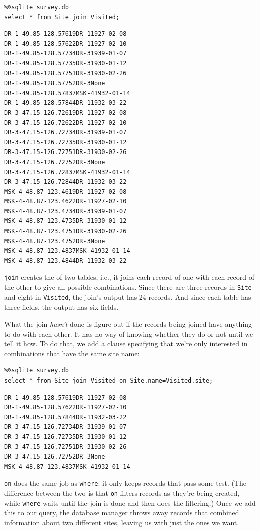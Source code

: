 \documentclass{book}
\begin{document}
\begin{verbatim}
%%sqlite survey.db
select * from Site join Visited;
\end{verbatim}

\begin{verbatim}
DR-1-49.85-128.57619DR-11927-02-08
DR-1-49.85-128.57622DR-11927-02-10
DR-1-49.85-128.57734DR-31939-01-07
DR-1-49.85-128.57735DR-31930-01-12
DR-1-49.85-128.57751DR-31930-02-26
DR-1-49.85-128.57752DR-3None
DR-1-49.85-128.57837MSK-41932-01-14
DR-1-49.85-128.57844DR-11932-03-22
DR-3-47.15-126.72619DR-11927-02-08
DR-3-47.15-126.72622DR-11927-02-10
DR-3-47.15-126.72734DR-31939-01-07
DR-3-47.15-126.72735DR-31930-01-12
DR-3-47.15-126.72751DR-31930-02-26
DR-3-47.15-126.72752DR-3None
DR-3-47.15-126.72837MSK-41932-01-14
DR-3-47.15-126.72844DR-11932-03-22
MSK-4-48.87-123.4619DR-11927-02-08
MSK-4-48.87-123.4622DR-11927-02-10
MSK-4-48.87-123.4734DR-31939-01-07
MSK-4-48.87-123.4735DR-31930-01-12
MSK-4-48.87-123.4751DR-31930-02-26
MSK-4-48.87-123.4752DR-3None
MSK-4-48.87-123.4837MSK-41932-01-14
MSK-4-48.87-123.4844DR-11932-03-22
\end{verbatim}

\texttt{join} creates the  of
two tables, i.e., it joins each record of one with each record of the
other to give all possible combinations. Since there are three records
in \texttt{Site} and eight in \texttt{Visited}, the join's output has 24
records. And since each table has three fields, the output has six
fields.

What the join \emph{hasn't} done is figure out if the records being
joined have anything to do with each other. It has no way of knowing
whether they do or not until we tell it how. To do that, we add a clause
specifying that we're only interested in combinations that have the same
site name:

\begin{verbatim}
%%sqlite survey.db
select * from Site join Visited on Site.name=Visited.site;
\end{verbatim}

\begin{verbatim}
DR-1-49.85-128.57619DR-11927-02-08
DR-1-49.85-128.57622DR-11927-02-10
DR-1-49.85-128.57844DR-11932-03-22
DR-3-47.15-126.72734DR-31939-01-07
DR-3-47.15-126.72735DR-31930-01-12
DR-3-47.15-126.72751DR-31930-02-26
DR-3-47.15-126.72752DR-3None
MSK-4-48.87-123.4837MSK-41932-01-14
\end{verbatim}

\texttt{on} does the same job as \texttt{where}: it only keeps records
that pass some test. (The difference between the two is that \texttt{on}
filters records as they're being created, while \texttt{where} waits
until the join is done and then does the filtering.) Once we add this to
our query, the database manager throws away records that combined
information about two different sites, leaving us with just the ones we
want.
\end{document}
